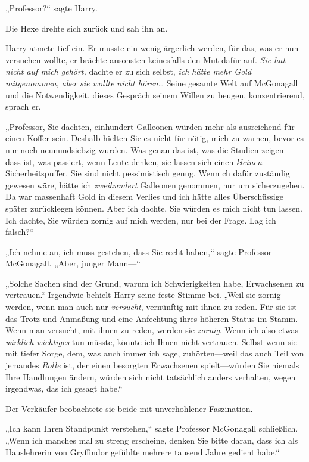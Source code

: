 {„Professor?“ sagte Harry.

Die Hexe drehte sich zurück und sah ihn an.

Harry atmete tief ein. Er musste ein wenig ärgerlich werden, für das, was er nun versuchen wollte, er brächte ansonsten keinesfalls den Mut dafür auf. \emph{Sie hat nicht auf mich gehört,} dachte er zu sich selbst, \emph{ich hätte mehr Gold mitgenommen, aber sie wollte nicht hören…} Seine gesamte Welt auf McGonagall und die Notwendigkeit, dieses Gespräch seinem Willen zu beugen, konzentrierend, sprach er.

„Professor, Sie dachten, einhundert Galleonen würden mehr als ausreichend für einen Koffer sein. Deshalb hielten Sie es nicht für nötig, mich zu warnen, bevor es nur noch neunundsiebzig wurden. Was genau das ist, was die Studien zeigen—dass ist, was passiert, wenn Leute denken, sie lassen sich einen \emph{kleinen} Sicherheitspuffer. Sie sind nicht pessimistisch genug. Wenn ch dafür zuständig gewesen wäre, hätte ich \emph{zweihundert} Galleonen genommen, nur um sicherzugehen. Da war massenhaft Gold in diesem Verlies und ich hätte alles Überschüssige später zurücklegen können. Aber ich dachte, Sie würden es mich nicht tun lassen. Ich dachte, Sie würden zornig auf mich werden, nur bei der Frage. Lag ich falsch?“

„Ich nehme an, ich muss gestehen, dass Sie recht haben,“ sagte Professor McGonagall. „Aber, junger Mann—“

„Solche Sachen sind der Grund, warum ich Schwierigkeiten habe, Erwachsenen zu vertrauen.“ Irgendwie behielt Harry seine feste Stimme bei. „Weil sie zornig werden, wenn man auch nur \emph{versucht}, vernünftig mit ihnen zu reden. Für sie ist das Trotz und Anmaßung und eine Anfechtung ihres höheren Status im Stamm. Wenn man versucht, mit ihnen zu reden, werden sie \emph{zornig}. Wenn ich also etwas \emph{wirklich wichtiges} tun müsste, könnte ich Ihnen nicht vertrauen. Selbst wenn sie mit tiefer Sorge, dem, was auch immer ich sage, zuhörten—weil das auch Teil von jemandes \emph{Rolle} ist, der einen besorgten Erwachsenen spielt—würden Sie niemals Ihre Handlungen ändern, würden sich nicht tatsächlich anders verhalten, wegen irgendwas, das ich gesagt habe.“

Der Verkäufer beobachtete sie beide mit unverhohlener Faszination.

„Ich kann Ihren Standpunkt verstehen,“ sagte Professor McGonagall schließlich. „Wenn ich manches mal zu streng erscheine, denken Sie bitte daran, dass ich als Hauslehrerin von Gryffindor gefühlte mehrere tausend Jahre gedient habe.“

}
